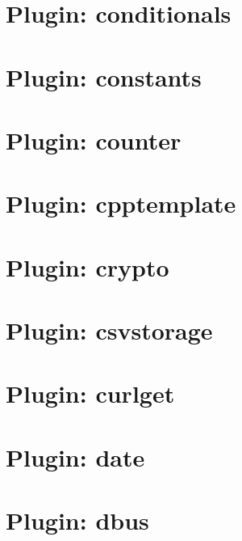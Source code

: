\let\mypdfximage\pdfximage\def\pdfximage{\immediate\mypdfximage}\documentclass[twoside]{book}
\newcommand{\+}{\discretionary{\mbox{\scriptsize$\hookleftarrow$}}{}{}}
\begin{document}
\chapter{Plugin\+: conditionals}
\label{md_src_plugins_conditionals_README}

\chapter{Plugin\+: constants}
\label{md_src_plugins_constants_README}

\chapter{Plugin\+: counter}
\label{md_src_plugins_counter_README}

\chapter{Plugin\+: cpptemplate}
\label{md_src_plugins_cpptemplate_README}

\chapter{Plugin\+: crypto}
\label{md_src_plugins_crypto_README}

\chapter{Plugin\+: csvstorage}
\label{md_src_plugins_csvstorage_README}

\chapter{Plugin\+: curlget}
\label{md_src_plugins_curlget_README}

\chapter{Plugin\+: date}
\label{md_src_plugins_date_README}

\chapter{Plugin\+: dbus}
\label{md_src_plugins_dbus_README}

\end{document}

